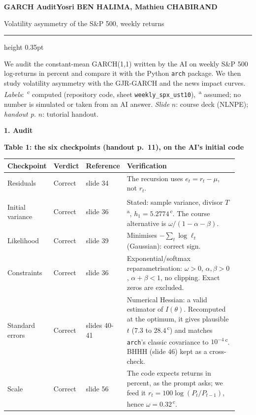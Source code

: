 \documentclass[10pt,a4paper]{article}
\newcommand{\sectionline}[1]{\vspace{3pt}\textbf{#1}\par}
\newcommand{\lc}{\textsuperscript{\,c}}
\newcommand{\la}{\textsuperscript{\,a}}
\begin{document}
{\Large\bfseries GARCH Audit}\hfill {\small\bfseries Yosri BEN HALIMA, Mathieu CHABIRAND}\par
{\small Volatility asymmetry of the S\&P 500, weekly returns}\par
\vspace{3pt}\hrule height 0.35pt\vspace{4pt}

We audit the constant-mean GARCH(1,1) written by the AI on weekly S\&P 500 log-returns in percent
and compare it with the Python \texttt{arch} package. We then study volatility asymmetry with the GJR-GARCH
and the news impact curves.
{\small\emph{Labels}: \lc{} computed (repository code, sheet \texttt{weekly\_spx\_ust10}), \la{} assumed;
no number is simulated or taken from an AI answer. \emph{Slide} $n$: course deck (NLNPE); \emph{handout p.} $n$: tutorial handout.}

\sectionline{1. Audit}
\begin{center}
\small
\renewcommand{\arraystretch}{1.05}
\textbf{Table 1: the six checkpoints (handout p.~11), on the AI's initial code}\par
\begin{tabular}{@{}p{0.15\linewidth}p{0.075\linewidth}p{0.10\linewidth}p{0.605\linewidth}@{}}
\toprule
Checkpoint & Verdict & Reference & Verification \\
\midrule
Residuals & Correct & slide 34 & The recursion uses $e_t=r_t-\mu$, not $r_t$. \\
Initial variance & Correct & slide 36 & Stated: sample variance, divisor $T$\la, $h_1=5.2774$\lc. The course alternative is $\omega/(1-\alpha-\beta)$. \\
Likelihood & Correct & slide 39 & Minimises $-\sum_t\log\ell_t$ (Gaussian): correct sign. \\
Constraints & Correct & slide 36 & Exponential/softmax reparametrisation: $\omega>0$, $\alpha,\beta>0$, $\alpha+\beta<1$, no clipping. Exact zeros are excluded. \\
Standard errors & Correct & slides 40-41 & Numerical Hessian: a valid estimator of $I(\theta)$. Recomputed at the optimum, it gives plausible $t$ ($7.3$ to $28.4$\lc) and matches \texttt{arch}'s classic covariance to $10^{-4}$\lc. BHHH (slide 46) kept as a cross-check. \\
Scale & Correct & slide 56 & The code expects returns in percent, as the prompt asks; we feed it $r_t=100\log(P_t/P_{t-1})$, hence $\hat\omega=0.32$\lc. \\
\bottomrule
\end{tabular}
\par\vspace{1pt}{\footnotesize The rest of the report uses the final version (BHHH standard errors, Hessian as a cross-check).}
\end{center}
\end{document}
